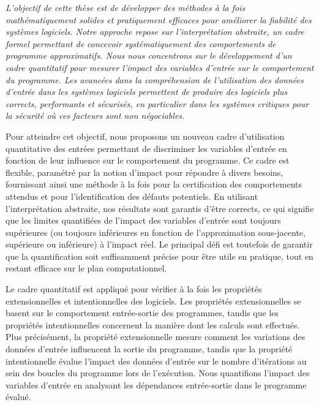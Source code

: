 {\em
L'objectif de cette thèse est de développer des méthodes à la fois mathématiquement solides et pratiquement efficaces pour améliorer la fiabilité des systèmes logiciels. Notre approche repose sur l'interprétation abstraite, un cadre formel permettant de concevoir systématiquement des comportements de programme approximatifs. Nous nous concentrons sur le développement d'un cadre quantitatif pour mesurer l'impact des variables d'entrée sur le comportement du programme. Les avancées dans la compréhension de l'utilisation des données d'entrée dans les systèmes logiciels permettent de produire des logiciels plus corrects, performants et sécurisés, en particulier dans les systèmes critiques pour la sécurité où ces facteurs sont non négociables.

Pour atteindre cet objectif, nous proposons un nouveau cadre d'utilisation quantitative des entrées permettant de discriminer les variables d'entrée en fonction de leur influence sur le comportement du programme. Ce cadre est flexible, paramétré par la notion d'impact pour répondre à divers besoins, fournissant ainsi une méthode à la fois pour la certification des comportements attendus et pour l'identification des défauts potentiels. En utilisant l'interprétation abstraite, nos résultats sont garantis d'être corrects, ce qui signifie que les limites quantifiées de l'impact des variables d'entrée sont toujours supérieures (ou toujours inférieures en fonction de l'approximation sous-jacente, supérieure ou inférieure) à l'impact réel. Le principal défi est toutefois de garantir que la quantification soit suffisamment précise pour être utile en pratique, tout en restant efficace sur le plan computationnel.

Le cadre quantitatif est appliqué pour vérifier à la fois les propriétés extensionnelles et intentionnelles des logiciels. Les propriétés extensionnelles se basent sur le comportement entrée-sortie des programmes, tandis que les propriétés intentionnelles concernent la manière dont les calculs sont effectués. Plus précisément, la propriété extensionnelle mesure comment les variations des données d'entrée influencent la sortie du programme, tandis que la propriété intentionnelle évalue l'impact des données d'entrée sur le nombre d'itérations au sein des boucles du programme lors de l'exécution. Nous quantifions l'impact des variables d'entrée en analysant les dépendances entrée-sortie dans le programme évalué.

}
